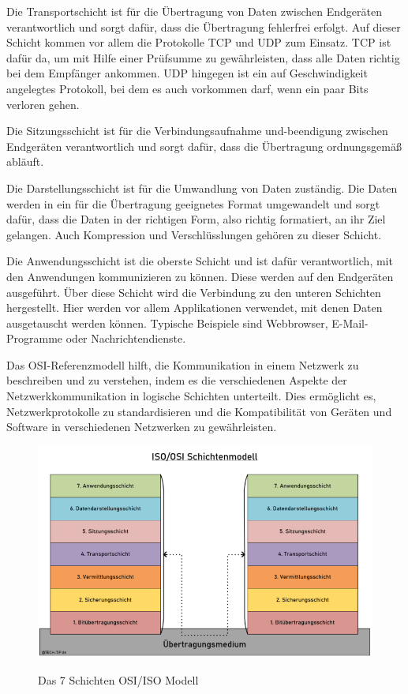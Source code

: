 \begin{compactenum}
\item Die Transportschicht ist für die Übertragung von Daten zwischen Endgeräten verantwortlich und sorgt dafür, dass die Übertragung fehlerfrei erfolgt. Auf dieser Schicht kommen vor allem die Protokolle TCP und UDP zum Einsatz. TCP ist dafür da, um mit Hilfe einer Prüfsumme zu gewährleisten, dass alle Daten richtig bei dem Empfänger ankommen. UDP hingegen ist ein auf Geschwindigkeit angelegtes Protokoll, bei dem es auch vorkommen darf, wenn ein paar Bits verloren gehen.
\item Die Sitzungsschicht ist für die Verbindungsaufnahme und-beendigung zwischen Endgeräten verantwortlich und sorgt dafür, dass die Übertragung ordnungsgemäß abläuft.
\item Die Darstellungsschicht ist für die Umwandlung von Daten zuständig. Die Daten werden in ein für die Übertragung geeignetes Format umgewandelt und sorgt dafür, dass die Daten in der richtigen Form, also richtig formatiert, an ihr Ziel gelangen. Auch Kompression und Verschlüsslungen gehören zu dieser Schicht.
\item Die Anwendungsschicht ist die oberste Schicht und ist dafür verantwortlich, mit den Anwendungen kommunizieren zu können. Diese werden auf den Endgeräten ausgeführt. Über diese Schicht wird die Verbindung zu den unteren Schichten hergestellt. Hier werden vor allem Applikationen verwendet, mit denen Daten ausgetauscht werden können. Typische Beispiele sind Webbrowser, E-Mail-Programme oder Nachrichtendienste.
\end{compactenum}\cite{ISO/OSI-Referenzmodell}



Das OSI-Referenzmodell hilft, die Kommunikation in einem Netzwerk zu beschreiben und zu verstehen, indem es die verschiedenen Aspekte der Netzwerkkommunikation in logische Schichten unterteilt. Dies ermöglicht es, Netzwerkprotokolle zu standardisieren und die Kompatibilität von Geräten und Software in verschiedenen Netzwerken zu gewährleisten.


\begin{figure}[h t] \cite{7schichtenModell}
\centering
\includegraphics[scale=0.5]{pics/ISO-OSI-Modell-768x486.png}
\caption{Das 7 Schichten OSI/ISO Modell}
\label{fig:impl:Wallbox7schichtenmodell}
\end{figure}




